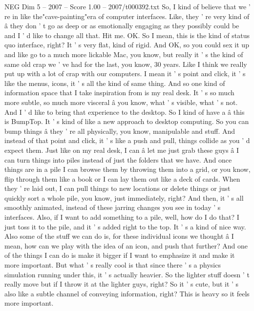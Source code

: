 \begin{textsample}{NEG Dim 5 – 2007 – Score 1.00 – 2007/t000392.txt}  \label{ex:f5_neg_057}
So, I kind of believe that we ' re in like the"cave-painting"era of computer interfaces.
Like, they ' re very kind of â they don ' t go as deep or as emotionally engaging as they possibly could be and I ' d like to change all that.
Hit me.
OK.
So I mean, this is the kind of status quo interface, right?
It ' s very flat, kind of rigid.
And OK, so you could sex it up and like go to a much more lickable Mac, you know, but really it ' s the kind of same old crap we ' ve had for the last, you know, 30 years.
Like I think we really put up with a lot of crap with our computers.
I mean it ' s point and click, it ' s like the menus, icons, it ' s all the kind of same thing.
And so one kind of information space that I take inspiration from is my real desk.
It ' s so much more subtle, so much more visceral â you know, what ' s visible, what ' s not.
And I ' d like to bring that experience to the desktop.
So I kind of have a â this is BumpTop.
It ' s kind of like a new approach to desktop computing.
So you can bump things â they ' re all physically, you know, manipulable and stuff.
And instead of that point and click, it ' s like a push and pull, things collide as you ' d expect them.
Just like on my real desk, I can â let me just grab these guys â I can turn things into piles instead of just the folders that we have.
And once things are in a pile I can browse them by throwing them into a grid, or you know, flip through them like a book or I can lay them out like a deck of cards.
When they ' re laid out, I can pull things to new locations or delete things or just quickly sort a whole pile, you know, just immediately, right?
And then, it ' s all smoothly animated, instead of these jarring changes you see in today ' s interfaces.
Also, if I want to add something to a pile, well, how do I do that?
I just toss it to the pile, and it ' s added right to the top.
It ' s a kind of nice way.
Also some of the stuff we can do is, for these individual icons we thought â I mean, how can we play with the idea of an icon, and push that further?
And one of the things I can do is make it bigger if I want to emphasize it and make it more important.
But what ' s really cool is that since there ' s a physics simulation running under this, it ' s actually heavier.
So the lighter stuff doesn ' t really move but if I throw it at the lighter guys, right?
So it ' s cute, but it ' s also like a subtle channel of conveying information, right?
This is heavy so it feels more important.

\end{textsample}
